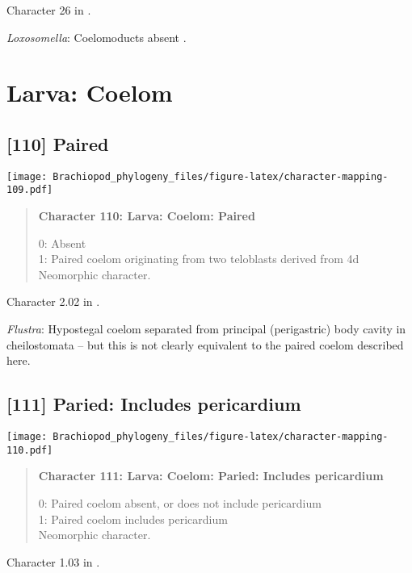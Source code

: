 \documentclass[openany]{book}
\theoremstyle{definition}
\theoremstyle{definition}
\theoremstyle{definition}
\theoremstyle{remark}
\begin{document}
Character 26 in \citet{Haszprunar2000}.

\hypertarget{Loxosomella-coding-109}{}
\emph{Loxosomella}: Coelomoducts absent \citep{Haszprunar2000}.

\section{Larva: Coelom}\label{larva-coelom}

\subsection*{{[}110{]} Paired}\label{paired}

\texttt{[image: Brachiopod\_phylogeny\_files/figure-latex/character-mapping-109.pdf]}

\begin{quote}
\textbf{Character 110: Larva: Coelom: Paired}

0: Absent\\
1: Paired coelom originating from two teloblasts derived from 4d\\
Neomorphic character.
\end{quote}

Character 2.02 in \citet{Scheltema1993}.

\hypertarget{Flustra-coding-110}{}
\emph{Flustra}: Hypostegal coelom separated from principal (perigastric)
body cavity in cheilostomata -- but this is not clearly equivalent to
the paired coelom described here.

\subsection*{{[}111{]} Paried: Includes
pericardium}\label{paried-includes-pericardium}

\texttt{[image: Brachiopod\_phylogeny\_files/figure-latex/character-mapping-110.pdf]}

\begin{quote}
\textbf{Character 111: Larva: Coelom: Paried: Includes pericardium}

0: Paired coelom absent, or does not include pericardium\\
1: Paired coelom includes pericardium\\
Neomorphic character.
\end{quote}

Character 1.03 in \citet{Scheltema1993}.
\end{document}
